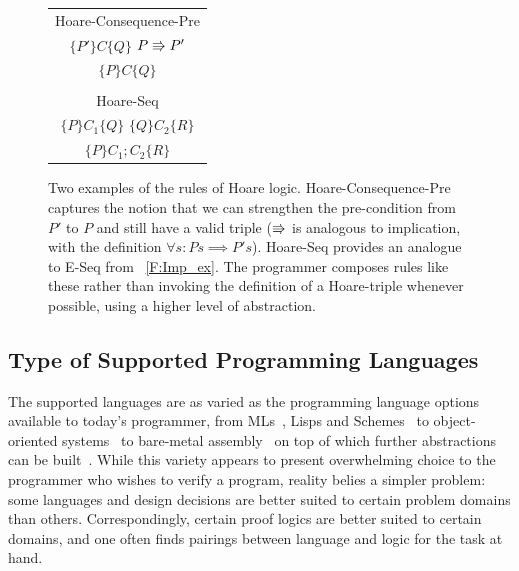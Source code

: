 \begin{figure}
    \centering
    \begin{tabular}{c}
        Hoare-Consequence-Pre \\
        \(\{P'\} C \{Q\}\) \quad \(P \mathrel{\Rrightarrow} P'\) \\
        \midrule
        \(\{P\} C \{Q\}\) \\

        \\

        Hoare-Seq \\
        \(\{P\} C_1 \{Q\}\) \quad \(\{Q\} C_2 \{R\}\) \\
        \midrule
        \(\{P\} C_1;C_2 \{R\}\)
    \end{tabular}
    \caption{Two examples of the rules of Hoare logic. Hoare-Consequence-Pre
    captures the notion that we can strengthen the pre-condition from \(P'\) to
    \(P\) and still have a valid triple (\(\mathrel{\Rrightarrow}\) is analogous to implication,
    with the definition \(\forall s: P s \implies P' s\)). Hoare-Seq provides an
    analogue to E-Seq from \figurename~\ref{F:Imp_ex}. The programmer composes
    rules like these rather than invoking the definition of a Hoare-triple
    whenever possible, using a higher level of abstraction.}\label{F:Hoare_ex}
\end{figure}




\subsection{Type of Supported Programming Languages}\label{S:t_pl}

The supported languages are as varied as the programming language options
available to today's programmer, from MLs~\cite{Coq}, Lisps and
Schemes~\cite{Torlak_2013} to object-oriented
systems~\cite{leino2008specification,leino2010dafny} to bare-metal
assembly~\cite{Chlipala_2011} on top of which further abstractions can be
built~\cite{Chlipala_2015}. While this variety appears to present overwhelming
choice to the programmer who wishes to verify a program, reality belies a
simpler problem: some languages and design decisions are better suited to
certain problem domains than others. Correspondingly, certain proof logics are
better suited to certain domains, and one often finds pairings between language
and logic for the task at hand.

